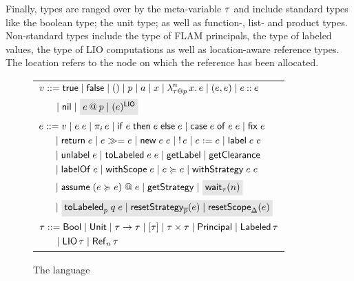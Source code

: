 Finally, types are ranged over by the meta-variable $\tau$ and include standard types like the boolean type; the unit type; as well as function-, list- and product types. Non-standard types include the type of FLAM principals, the type of labeled values, the type of LIO computations as well as location-aware reference types. The location refers to the node on which the reference has been allocated.

\begin{figure}
    \centering
    \begin{tabular}{l}
         $\begin{aligned}[t]
         \val &::= \true \mid \false \mid () \mid p \mid \addr \mid x \mid \abs{n}{\lb{p}{\type}}{x}{\expr} \mid (\expr, \expr) \mid \cons{\expr}{\expr} \\
         &\quad \mid \nil \mid \graybox{\lb{p}{\expr} \mid \lio{\expr}}
         \end{aligned}$ \\
         $\begin{aligned}[t]
         \expr &::= \val \mid \app{\expr}{\expr} \mid \proj{i}{\expr} \mid \ifexpr{\expr}{\expr}{\expr} \mid \case{\expr}{\expr}{\expr} \mid \fix{\expr} \\ &\quad \mid \return{\expr} \mid \bind{\expr}{\expr} \mid
         \new{\expr}{\expr} \mid \readref{\expr} \mid \writeref{\expr}{\expr} \mid \Label{\expr}{\expr} \\ &\quad
         \mid \unlabel{\expr} \mid
         \tolabeled{\expr}{\expr} \mid \getlabel \mid \getclearance \\ &\quad
         \mid \labelof{\expr} \mid \withscope{\expr} \mid \expr \actsfor \expr \mid \withstrategy{\expr}{\expr} \\ &\quad \mid \adddelegate{\expr}{\expr}{\expr} \mid \getstrategy
         \mid \graybox{\wait{n}[\type]} \\ &\quad
         \mid \graybox{\internalTolabeled{p}{q}{\expr} \mid \resetstrategy{\overline{p}}{\expr} \mid \resetscope{\scope}{\expr}}
         \end{aligned}$ \\
         $\begin{aligned}[t]
         \type &::= \bool \mid \unit \mid \func{\type}{\type} \mid \listtype{\type} \mid \pair{\type}{\type} \mid \labeltype \mid \labeled{\type} \\ &\quad
         \mid \liotype{\type} \mid \reftype[n]{\type}
         \end{aligned}$
    \end{tabular}
    \caption{The \lang{} language}
    \label{fig:language-syntax}
\end{figure}

